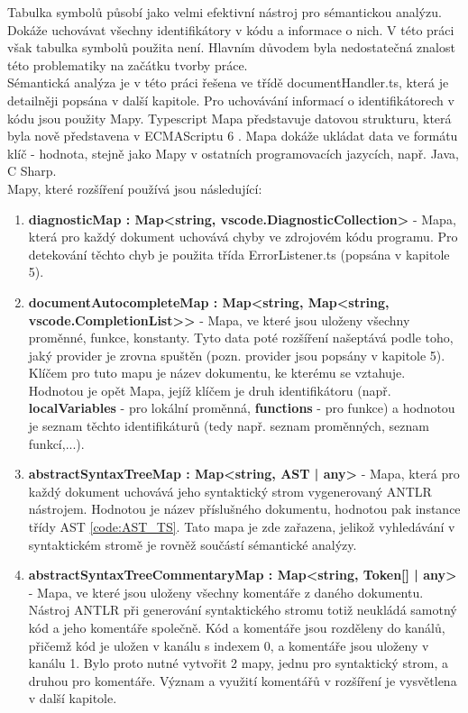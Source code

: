 Tabulka symbolů působí jako velmi efektivní nástroj pro sémantickou analýzu. Dokáže uchovávat všechny identifikátory v kódu a informace o nich. V této práci však tabulka symbolů použita není. Hlavním důvodem byla nedostatečná znalost této problematiky na začátku tvorby práce.\\
Sémantická analýza je v této práci řešena ve třídě documentHandler.ts, která je detailněji popsána v další kapitole. Pro uchovávání informací o identifikátorech v kódu jsou použity Mapy. Typescript Mapa představuje datovou strukturu, která byla nově představena v ECMAScriptu 6 \cite{ES6}. Mapa dokáže ukládat data ve formátu klíč - hodnota, stejně jako Mapy v ostatních programovacích jazycích, např. Java, C Sharp.\\
Mapy, které rozšíření používá jsou následující: \begin{enumerate}

\item \textbf{diagnosticMap : Map<string, vscode.DiagnosticCollection>} - Mapa, která pro každý dokument uchovává chyby ve zdrojovém kódu programu. Pro detekování těchto chyb je použita třída ErrorListener.ts (popsána v kapitole 5).

\item \textbf{documentAutocompleteMap : Map<string, Map<string, vscode.CompletionList>>} - Mapa, ve které jsou uloženy všechny proměnné, funkce, konstanty. Tyto data poté rozšíření našeptává podle toho, jaký provider je zrovna spuštěn (pozn. provider jsou popsány v kapitole 5). Klíčem pro tuto mapu je název dokumentu, ke kterému se vztahuje. Hodnotou je opět Mapa, jejíž klíčem je druh identifikátoru (např. \textbf{localVariables} - pro lokální proměnná, \textbf{functions} - pro funkce) a hodnotou je seznam těchto identifikáturů (tedy např. seznam proměnných, seznam funkcí,...). 

\item \textbf{abstractSyntaxTreeMap : Map<string, AST | any>} - Mapa, která pro každý dokument uchovává jeho syntaktický strom vygenerovaný ANTLR nástrojem. Hodnotou je název příslušného dokumentu, hodnotou pak instance třídy AST \ref{code:AST_TS}. Tato mapa je zde zařazena, jelikož vyhledávání v syntaktickém stromě je rovněž součástí sémantické analýzy.

\item \textbf{abstractSyntaxTreeCommentaryMap : Map<string, Token[] | any>} - Mapa, ve které jsou uloženy všechny komentáře z daného dokumentu. Nástroj ANTLR při generování syntaktického stromu totiž neukládá samotný kód a jeho komentáře společně. Kód a komentáře jsou rozděleny do kanálů, přičemž kód je uložen v kanálu s indexem 0, a komentáře jsou uloženy v kanálu 1. Bylo proto nutné vytvořit 2 mapy, jednu pro syntaktický strom, a druhou pro komentáře. Význam a využití komentářů v rozšíření je vysvětlena v další kapitole.
\end{enumerate}

\endinput
